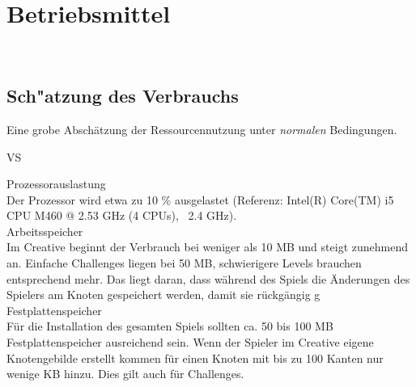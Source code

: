 %
%


\chapter{Betriebsmittel}
\label{BM}~\\

\section{Sch{"a}tzung des Verbrauchs}
\label{BM:Verbrauch}

Eine grobe Abschätzung der Ressourcennutzung unter \textit{normalen} Bedingungen.\\

\begin{ids}{\gls{VS}}

	\id[10] Prozessorauslastung \hfill\\
	
	Der Prozessor wird etwa zu 10 \% ausgelastet (Referenz: Intel(R) Core(TM) i5 CPU M460 @ 2.53 GHz (4 CPUs), ~2.4 GHz).\\
	
	\id[20] Arbeitsspeicher \hfill\\
	
	Im Creative beginnt der Verbrauch bei weniger als 10 MB und steigt zunehmend an. Einfache Challenges liegen bei 50 MB, schwierigere Levels brauchen entsprechend mehr. Das liegt daran, dass während des Spiels die Änderungen des Spielers am Knoten gespeichert werden, damit sie rückgängig g\\
	
	
	\id[30] Festplattenspeicher \hfill\\
		
	Für die Installation des gesamten Spiels sollten ca. 50 bis 100 MB Festplattenspeicher ausreichend sein. Wenn der Spieler im Creative eigene Knotengebilde erstellt kommen für einen Knoten mit bis zu 100 Kanten nur wenige KB hinzu. Dies gilt auch für Challenges.\\

\end{ids}


